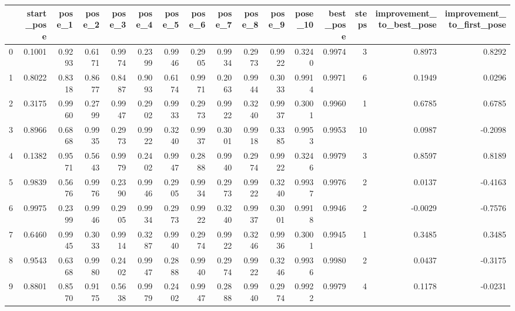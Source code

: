 \begin{tabular}{lrrrrrrrrrrrrrrr}
\toprule
{} &  start\_pose &  pose\_1 &  pose\_2 &  pose\_3 &  pose\_4 &  pose\_5 &  pose\_6 &  pose\_7 &  pose\_8 &  pose\_9 &  pose\_10 &  best\_pose &  steps &  improvement\_to\_best\_pose &  improvement\_to\_first\_pose \\
\midrule
0   &      0.1001 &  0.9293 &  0.6171 &  0.9974 &  0.2399 &  0.9946 &  0.2905 &  0.9934 &  0.2973 &  0.9922 &   0.3240 &     0.9974 &      3 &                    0.8973 &                     0.8292 \\
1   &      0.8022 &  0.8318 &  0.8677 &  0.8487 &  0.9093 &  0.6174 &  0.9971 &  0.2063 &  0.9944 &  0.3033 &   0.9914 &     0.9971 &      6 &                    0.1949 &                     0.0296 \\
2   &      0.3175 &  0.9960 &  0.2799 &  0.9947 &  0.2902 &  0.9933 &  0.2973 &  0.9922 &  0.3240 &  0.9937 &   0.3001 &     0.9960 &      1 &                    0.6785 &                     0.6785 \\
3   &      0.8966 &  0.6868 &  0.9935 &  0.2973 &  0.9922 &  0.3240 &  0.9937 &  0.3001 &  0.9918 &  0.3385 &   0.9953 &     0.9953 &     10 &                    0.0987 &                    -0.2098 \\
4   &      0.1382 &  0.9571 &  0.5643 &  0.9979 &  0.2402 &  0.9947 &  0.2888 &  0.9940 &  0.2974 &  0.9922 &   0.3246 &     0.9979 &      3 &                    0.8597 &                     0.8189 \\
5   &      0.9839 &  0.5676 &  0.9976 &  0.2390 &  0.9946 &  0.2905 &  0.9934 &  0.2973 &  0.9922 &  0.3240 &   0.9937 &     0.9976 &      2 &                    0.0137 &                    -0.4163 \\
6   &      0.9975 &  0.2399 &  0.9946 &  0.2905 &  0.9934 &  0.2973 &  0.9922 &  0.3240 &  0.9937 &  0.3001 &   0.9918 &     0.9946 &      2 &                   -0.0029 &                    -0.7576 \\
7   &      0.6460 &  0.9945 &  0.3033 &  0.9914 &  0.3287 &  0.9940 &  0.2974 &  0.9922 &  0.3246 &  0.9936 &   0.3001 &     0.9945 &      1 &                    0.3485 &                     0.3485 \\
8   &      0.9543 &  0.6368 &  0.9980 &  0.2402 &  0.9947 &  0.2888 &  0.9940 &  0.2974 &  0.9922 &  0.3246 &   0.9936 &     0.9980 &      2 &                    0.0437 &                    -0.3175 \\
9   &      0.8801 &  0.8570 &  0.9175 &  0.5638 &  0.9979 &  0.2402 &  0.9947 &  0.2888 &  0.9940 &  0.2974 &   0.9922 &     0.9979 &      4 &                    0.1178 &                    -0.0231 \\

\end{tabular}
